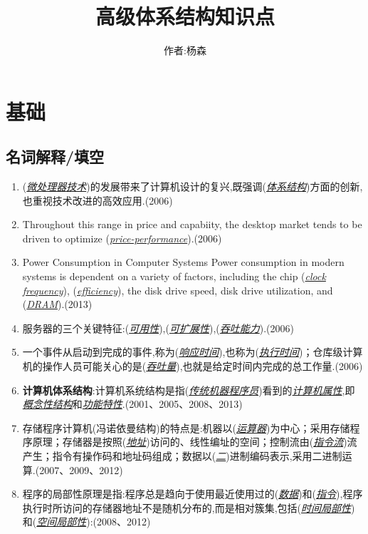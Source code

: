\documentclass[a4paper]{ctexart}
\newcommand{\blank}[1]{(\emph{\underline{#1}})}
\begin{document}
\title{高级体系结构知识点}
\author{作者:杨森}
\maketitle

\newpage
\section{基础}
\subsection{名词解释/填空}
\begin{enumerate}
  \item (\emph{\underline{微处理器技术}})的发展带来了计算机设计的复兴,既强调(\emph{\underline{体系结构}})方面的创新,也重视技术改进的高效应用.(2006)
  \item Throughout this range in price and capabiity, the desktop market tends to be driven to optimize (\emph{\underline{price-performance}}).(2006)
  \item Power Consumption in Computer Systems Power consumption in modern systems is dependent on a variety of factors, including the chip \blank{clock frequency}, \blank{efficiency}, the disk drive speed, disk drive utilization, and \blank{DRAM}.(2013)
  \item 服务器的三个关键特征:(\emph{\underline{可用性}}),(\emph{\underline{可扩展性}}),(\emph{\underline{吞吐能力}}).(2006)
  \item 一个事件从启动到完成的事件,称为(\emph{\underline{响应时间}}),也称为(\emph{\underline{执行时间}})；仓库级计算机的操作人员可能关心的是(\emph{\underline{吞吐量}}),也就是给定时间内完成的总工作量.(2006)
  \item \textbf{计算机体系结构}:计算机系统结构是指\blank{传统机器程序员}看到的\underline{\emph{计算机属性}},即\underline{\emph{概念性结构}}和\underline{\emph{功能特性}}.(2001、2005、2008、2013)
  \item 存储程序计算机(冯诺依曼结构)的特点是:机器以(\emph{\underline{运算器}})为中心；采用存储程序原理；存储器是按照(\emph{\underline{地址}})访问的、线性编址的空间；控制流由(\emph{\underline{指令流}})流产生；指令有操作码和地址码组成；数据以(\emph{\underline{二}})进制编码表示,采用二进制运算.(2007、2009、2012)
  \item 程序的局部性原理是指:程序总是趋向于使用最近使用过的(\emph{\underline{数据}})和(\emph{\underline{指令}}),程序执行时所访问的存储器地址不是随机分布的,而是相对簇集,包括(\emph{\underline{时间局部性}})和(\emph{\underline{空间局部性}}):(2008、2012)

\end{enumerate}
\end{document}
